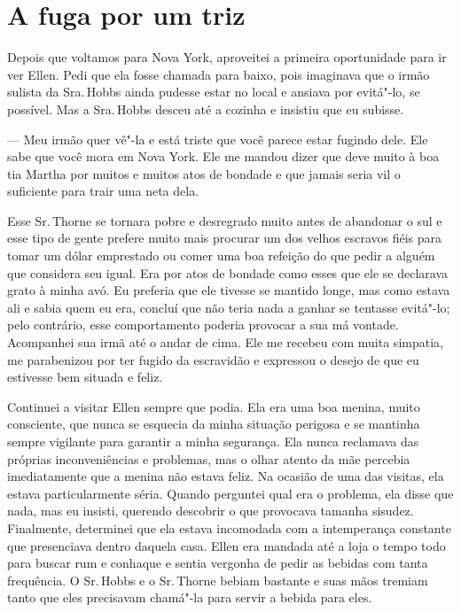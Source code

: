 \chapter*{A fuga por um triz}

Depois que voltamos para Nova York,
aproveitei a primeira oportunidade para ir ver Ellen. Pedi que ela fosse
chamada para baixo, pois imaginava que o irmão sulista da Sra.\,Hobbs
ainda pudesse estar no local e ansiava por evitá"-lo, se possível. Mas a
Sra.\,Hobbs desceu até a cozinha e insistiu que eu subisse.

--- Meu irmão quer vê"-la e está triste que você parece estar fugindo
dele. Ele sabe que você mora em Nova York. Ele me mandou dizer que deve
muito à boa tia Martha por muitos e muitos atos de bondade e que jamais
seria vil o suficiente para trair uma neta dela.

Esse Sr.\,Thorne se tornara pobre e
desregrado muito antes de abandonar o sul e esse tipo de gente prefere
muito mais procurar um dos velhos escravos fiéis para tomar um dólar
emprestado ou comer uma boa refeição do que pedir a alguém que considera
seu igual. Era por atos de bondade como esses que ele se declarava grato
à minha avó. Eu preferia que ele tivesse se mantido longe, mas como
estava ali e sabia quem eu era, concluí que não teria nada a ganhar se
tentasse evitá"-lo; pelo contrário, esse comportamento poderia provocar a
sua má vontade. Acompanhei sua irmã até o andar de cima. Ele me recebeu
com muita simpatia, me parabenizou por ter fugido da escravidão e
expressou o desejo de que eu estivesse bem situada e feliz.

Continuei a visitar Ellen sempre que
podia. Ela era uma boa menina, muito consciente, que nunca se esquecia
da minha situação perigosa e se mantinha sempre vigilante para garantir
a minha segurança. Ela nunca reclamava das próprias inconveniências e
problemas, mas o olhar atento da mãe percebia imediatamente que a menina
não estava feliz. Na ocasião de uma das visitas, ela estava
particularmente séria. Quando perguntei qual era o problema, ela disse
que nada, mas eu insisti, querendo descobrir o que provocava tamanha
sisudez. Finalmente, determinei que ela estava incomodada com a
intemperança constante que presenciava dentro daquela casa. Ellen era
mandada até a loja o tempo todo para buscar rum e conhaque e sentia
vergonha de pedir as bebidas com tanta frequência. O Sr.\,Hobbs e o Sr.\,Thorne bebiam bastante e suas mãos tremiam tanto que eles precisavam
chamá"-la para servir a bebida para eles.

